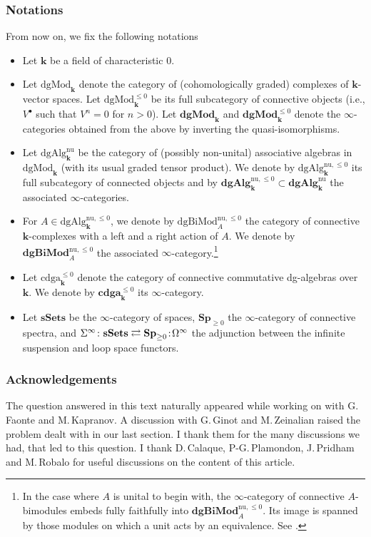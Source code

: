 \documentclass[11pt]{article}
\newcommand{\ie}{i.e.,\xspace}
\newcommand{\sbullet}{{\scriptscriptstyle\bullet}}
\theoremstyle{definition}
\newcommand{\noloc}{\mathchoice{\,:}{\!:\!}{:}{:}}
\newcommand{\sSets}{\mathbf{sSets}}
\newcommand{\Sp}{\mathbf{Sp}}
\newcommand{\cdgaunbounded}{\mathbf{cdga}}
\newcommand{\cdga}{\cdgaunbounded^{\leq 0}}
\newcommand{\dgAlg}{\mathbf{dgAlg}}
\newcommand{\dgMod}{\mathbf{dgMod}}
\newcommand{\MCdgMod}{\mathrm{dgMod}}
\newcommand{\MCcdga}{\mathrm{cdga}^{\leq 0}}
\newcommand{\MCdgAlg}{\mathrm{dgAlg}}
\newcommand{\infloop}{\operatorname{\Omega^\infty}}
\newcommand{\infsusp}{\operatorname{\Sigma^\infty}}
\renewcommand{\k}{{\boldsymbol{k}}}
\newcommand{\MCdgBiMod}{\mathrm{dgBiMod}}
\newcommand{\dgBiMod}{\mathbf{dgBiMod}}
\begin{document}
\subsubsection*{Notations}
From now on, we fix the following notations
\begin{itemize}
\item Let $\k$ be a field of characteristic $0$.
\item Let $\MCdgMod_\k$ denote the category of (cohomologically graded) complexes of $\k$\nobreakdash-vector spaces. Let $\MCdgMod_\k^{\leq 0}$ be its full subcategory of connective objects (\ie $V^\sbullet$ such that $V^n = 0$ for $n > 0$).
Let $\dgMod_\k$ and $\dgMod_\k^{\leq 0}$ denote the $\infty$-categories obtained from the above by inverting the quasi-isomorphisms.
\item Let $\MCdgAlg_\k^{\mathrm{nu}}$ be the category of (possibly non-unital) associative algebras in $\MCdgMod_\k$ (with its usual graded tensor product). We denote by $\MCdgAlg_\k^{\mathrm{nu},\leq 0}$ its full subcategory of connected objects and by $\dgAlg^{\mathrm{nu},\leq 0}_\k \subset \dgAlg_\k^{\mathrm{nu}}$ the associated $\infty$\nobreakdash-categories.
\item For $A \in \MCdgAlg_\k^{\mathrm{nu},\leq 0}$, we denote by $\MCdgBiMod_A^{\mathrm{nu},\leq 0}$ the category of connective $\k$-complexes with a left and a right action of $A$. We denote by $\dgBiMod^{\mathrm{nu},\leq 0}_A$ the associated $\infty$-category.\footnote{In the case where $A$ is unital to begin with, the $\infty$-category of connective $A$-bimodules embeds fully faithfully into $\dgBiMod^{\mathrm{nu},\leq 0}_A$. Its image is spanned by those modules on which a unit acts by an equivalence. See \cite[5.4.3.5 \& 5.4.3.14]{lurie:halg}.}
\item Let $\MCcdga_\k$ denote the category of connective commutative dg-algebras over $\k$. We denote by $\cdga_\k$ its $\infty$-category.
\item Let $\sSets$ be the $\infty$-category of spaces, $\Sp_{\geq 0}$ the $\infty$-category of connective spectra, and $\infsusp \colon \sSets \rightleftarrows \Sp_{\geq 0} \noloc \infloop$ the adjunction between the infinite suspension and loop space functors.
\end{itemize}

\subsubsection*{Acknowledgements}
The question answered in this text naturally appeared while working on \cite{faontehennionkapranov:kacmoody} with G.\,Faonte and M.\,Kapranov.
A discussion with G.\,Ginot and M.\,Zeinalian raised the problem dealt with in our last section. I thank them for the many discussions we had, that led to this question.
I thank D.\,Calaque, P\nobreakdash-G.\,Plamondon, J.\,Pridham and M.\,Robalo for useful discussions on the content of this article.
\end{document}
